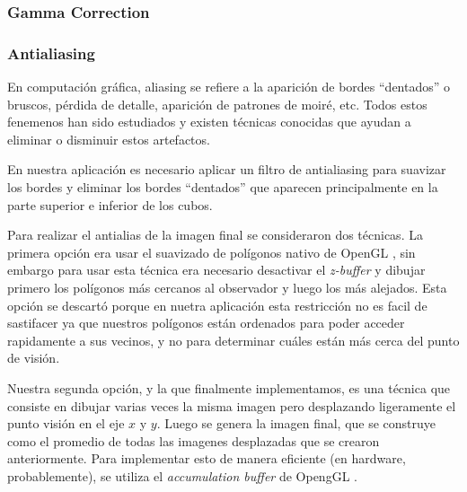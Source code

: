 \documentclass[letterpaper]{article}
\begin{document}
\subsubsection*{Gamma Correction}

\subsubsection*{Antialiasing}
\label{antialias}
En computación gráfica, aliasing se refiere a la aparición de bordes
``dentados'' o bruscos, pérdida de detalle, aparición de patrones de
moiré, etc. Todos estos fenemenos han sido estudiados \cite{alias1} y
existen técnicas conocidas que ayudan a eliminar o disminuir estos
artefactos.

En nuestra aplicación es necesario aplicar un filtro de antialiasing
para suavizar los bordes y eliminar los bordes ``dentados'' que
aparecen principalmente en la parte superior e inferior de los cubos.

Para realizar el antialias de la imagen final se consideraron dos
técnicas. La primera opción era usar el suavizado de polígonos nativo
de OpenGL \cite[capítulo~6]{redbook}, sin embargo para usar esta
técnica era necesario desactivar el \textsl{z-buffer} y dibujar
primero los polígonos más cercanos al observador y luego los más
alejados. Esta opción se descartó porque en nuetra aplicación esta
restricción no es facil de sastifacer ya que nuestros polígonos están
ordenados para poder acceder rapidamente a sus vecinos, y no para
determinar cuáles están más cerca del punto de visión.

Nuestra segunda opción, y la que finalmente implementamos, es una
técnica que consiste en dibujar varias veces la misma imagen pero
desplazando ligeramente el punto visión \cite{accum} en el eje $x$ y
$y$. Luego se genera la imagen final, que se construye como el
promedio de todas las imagenes desplazadas que se crearon
anteriormente. Para implementar esto de manera eficiente (en hardware,
probablemente), se utiliza el \textsl{accumulation buffer} de OpengGL
\cite{redbook}.
\end{document}
